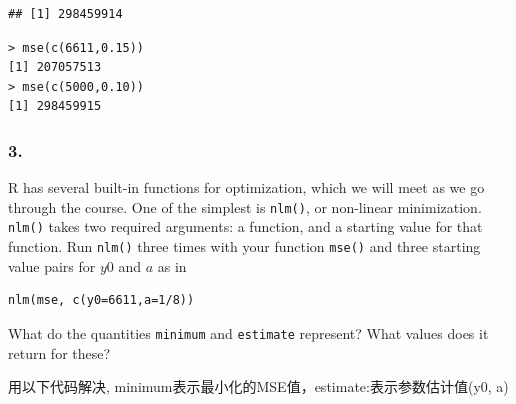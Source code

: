 \documentclass[
]{article}
\newenvironment{Shaded}{\begin{snugshade}}{\end{snugshade}}
\newcommand{\AttributeTok}[1]{\textcolor[rgb]{0.13,0.29,0.53}{#1}}
\newcommand{\CommentTok}[1]{\textcolor[rgb]{0.56,0.35,0.01}{\textit{#1}}}
\newcommand{\DecValTok}[1]{\textcolor[rgb]{0.00,0.00,0.81}{#1}}
\newcommand{\FloatTok}[1]{\textcolor[rgb]{0.00,0.00,0.81}{#1}}
\newcommand{\FunctionTok}[1]{\textcolor[rgb]{0.13,0.29,0.53}{\textbf{#1}}}
\newcommand{\NormalTok}[1]{#1}
\newcommand{\OtherTok}[1]{\textcolor[rgb]{0.56,0.35,0.01}{#1}}
\newcommand{\SpecialCharTok}[1]{\textcolor[rgb]{0.81,0.36,0.00}{\textbf{#1}}}
\begin{document}
\begin{verbatim}
## [1] 298459914
\end{verbatim}

\begin{verbatim}
> mse(c(6611,0.15))
[1] 207057513
> mse(c(5000,0.10))
[1] 298459915
\end{verbatim}

\subsubsection{3.}\label{section-2}

R has several built-in functions for optimization, which we will meet as
we go through the course. One of the simplest is \texttt{nlm()}, or
non-linear minimization. \texttt{nlm()} takes two required arguments: a
function, and a starting value for that function. Run \texttt{nlm()}
three times with your function \texttt{mse()} and three starting value
pairs for \(y0\) and \(a\) as in

\begin{verbatim}
nlm(mse, c(y0=6611,a=1/8))
\end{verbatim}

What do the quantities \texttt{minimum} and \texttt{estimate} represent?
What values does it return for these?

用以下代码解决, minimum表示最小化的MSE值，estimate:表示参数估计值(y0, a)

\begin{Shaded}
\end{Shaded}
\end{document}
